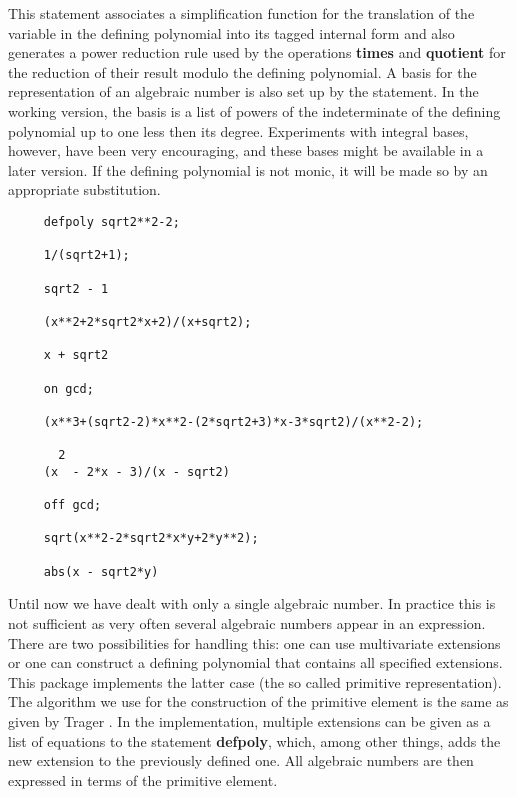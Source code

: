 This statement associates a simplification function for the
translation of the variable in the defining polynomial into its tagged
internal form and also generates a power reduction rule used by the
operations {\bf times} and {\bf quotient} for the reduction of their
result modulo the defining polynomial.  A basis for the representation
of an algebraic number is also set up by the statement.  In the
working version, the basis is a list of powers of the indeterminate of
the defining polynomial up to one less then its degree.  Experiments
with integral bases, however, have been very encouraging, and these
bases might be available in a later version.  If the defining
polynomial is not monic, it will be made so by an appropriate
substitution.

\example {}

\begin{verbatim}
     defpoly sqrt2**2-2;

     1/(sqrt2+1);

     sqrt2 - 1

     (x**2+2*sqrt2*x+2)/(x+sqrt2);

     x + sqrt2

     on gcd;

     (x**3+(sqrt2-2)*x**2-(2*sqrt2+3)*x-3*sqrt2)/(x**2-2);

       2
     (x  - 2*x - 3)/(x - sqrt2)

     off gcd;

     sqrt(x**2-2*sqrt2*x*y+2*y**2);

     abs(x - sqrt2*y)
\end{verbatim}

Until now we have dealt with only a single algebraic number.  In practice
this is not sufficient as very often several algebraic numbers appear in an
expression.  There are two possibilities for handling this: one can use
multivariate extensions \cite{Davenport:81} or one can construct a defining
polynomial that contains all specified extensions.  This package implements
the latter case (the so called primitive representation).  The algorithm we
use for the construction of the primitive element is the same as given by
Trager \cite{Trager:76}.  In the implementation, multiple extensions can be
given as a list of equations to the statement {\bf defpoly}, which, among other
things, adds the new extension to the previously defined one.  All
algebraic numbers are then expressed in terms of the primitive element.


